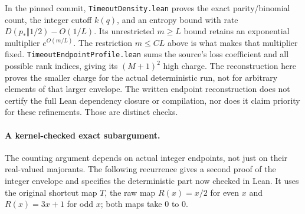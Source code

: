 \documentclass[11pt]{article}
\theoremstyle{remark}\newtheorem{remark}[proposition]{Remark}
\begin{document}
In the pinned commit, \texttt{TimeoutDensity.lean} proves the exact
parity/binomial count, the integer cutoff \(k(q)\), and an entropy
bound with rate \(D(p_*\Vert1/2)-O(1/L)\). Its unrestricted \(m\ge L\)
bound retains an exponential multiplier \(e^{O(m/L)}\).
The restriction \(m\le CL\) above is what makes that multiplier fixed.
\texttt{TimeoutEndpointProfile.lean} sums the source's loss coefficient
and all possible rank indices, giving its \((M+1)^2\) high charge.
The reconstruction here proves the smaller charge for the actual
deterministic run, not for arbitrary elements of that larger envelope.
The written endpoint reconstruction does not certify the full Lean
dependency closure or compilation, nor does it claim priority for
these refinements. Those are distinct checks.


\paragraph{A kernel-checked exact subargument.}
The counting argument depends on actual integer endpoints, not just on
their real-valued majorants. The following recurrence gives a second
proof of the integer envelope and specifies the deterministic part
now checked in Lean. It uses the original shortcut map \(T\), the raw
map \(R(x)=x/2\) for even \(x\) and \(R(x)=3x+1\) for odd \(x\);
both maps take \(0\) to \(0\).
\end{document}

